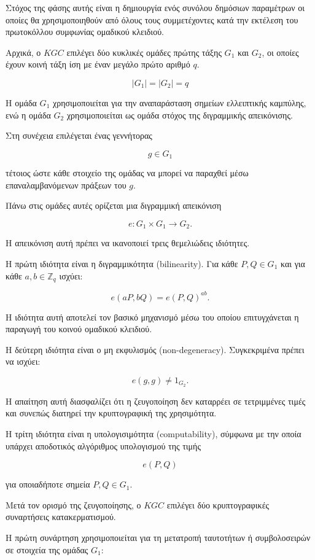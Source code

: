 \documentclass[12pt,a4paper]{report}
\begin{document}
Στόχος της φάσης αυτής είναι η δημιουργία ενός συνόλου δημόσιων παραμέτρων οι οποίες θα χρησιμοποιηθούν από όλους τους συμμετέχοντες κατά την εκτέλεση του πρωτοκόλλου συμφωνίας ομαδικού κλειδιού.

Αρχικά, ο $KGC$ επιλέγει δύο κυκλικές ομάδες πρώτης τάξης $G_1$ και $G_2$, οι οποίες έχουν κοινή τάξη ίση με έναν μεγάλο πρώτο αριθμό $q$.

\[
|G_1| = |G_2| = q
\]

Η ομάδα $G_1$ χρησιμοποιείται για την αναπαράσταση σημείων ελλειπτικής καμπύλης, ενώ η ομάδα $G_2$ χρησιμοποιείται ως ομάδα στόχος της διγραμμικής απεικόνισης.

Στη συνέχεια επιλέγεται ένας γεννήτορας

\[
g \in G_1
\]

τέτοιος ώστε κάθε στοιχείο της ομάδας να μπορεί να παραχθεί μέσω επαναλαμβανόμενων πράξεων του $g$.

Πάνω στις ομάδες αυτές ορίζεται μια διγραμμική απεικόνιση

\[
e : G_1 \times G_1 \rightarrow G_2.
\]

Η απεικόνιση αυτή πρέπει να ικανοποιεί τρεις θεμελιώδεις ιδιότητες.

Η πρώτη ιδιότητα είναι η διγραμμικότητα (bilinearity). Για κάθε $P,Q \in G_1$ και για κάθε $a,b \in \mathbb{Z}_q$ ισχύει:

\[
e(aP,bQ)=e(P,Q)^{ab}.
\]

Η ιδιότητα αυτή αποτελεί τον βασικό μηχανισμό μέσω του οποίου επιτυγχάνεται η παραγωγή του κοινού ομαδικού κλειδιού.

Η δεύτερη ιδιότητα είναι ο μη εκφυλισμός (non-degeneracy). Συγκεκριμένα πρέπει να ισχύει:

\[
e(g,g)\neq 1_{G_2}.
\]

Η απαίτηση αυτή διασφαλίζει ότι η ζευγοποίηση δεν καταρρέει σε τετριμμένες τιμές και συνεπώς διατηρεί την κρυπτογραφική της χρησιμότητα.

Η τρίτη ιδιότητα είναι η υπολογισιμότητα (computability), σύμφωνα με την οποία υπάρχει αποδοτικός αλγόριθμος υπολογισμού της τιμής

\[
e(P,Q)
\]

για οποιαδήποτε σημεία $P,Q \in G_1$.

Μετά τον ορισμό της ζευγοποίησης, ο $KGC$ επιλέγει δύο κρυπτογραφικές συναρτήσεις κατακερματισμού.

Η πρώτη συνάρτηση χρησιμοποιείται για τη μετατροπή ταυτοτήτων ή συμβολοσειρών σε στοιχεία της ομάδας $G_1$:
\end{document}
